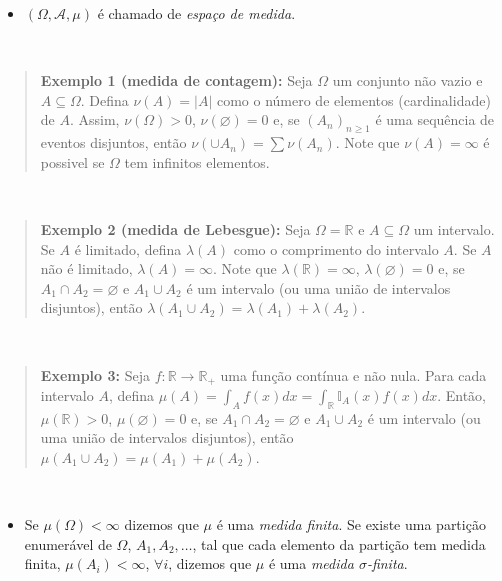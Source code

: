 \documentclass[
]{book}
\providecommand{\tightlist}{%
  \setlength{\itemsep}{0pt}\setlength{\parskip}{0pt}}
\begin{document}
\begin{itemize}
\tightlist
\item
  \((\Omega,\mathcal{A}, \mu)\) é chamado de \emph{espaço de medida}.
\end{itemize}

\(~\)

\begin{quote}
\textbf{Exemplo 1 (medida de contagem):} Seja \(\Omega\) um conjunto não vazio e \(A\subseteq \Omega\). Defina \(\nu(A)=|A|\) como o número de elementos (cardinalidade) de \(A\). Assim, \(\nu(\Omega) > 0\), \(\nu(\varnothing)=0\) e, se \((A_n)_{n \geq 1}\) é uma sequência de eventos disjuntos, então \(\nu(\cup A_n) = \sum \nu(A_n)\). Note que \(\nu(A)=\infty\) é possivel se \(\Omega\) tem infinitos elementos.
\end{quote}

\(~\)

\begin{quote}
\textbf{Exemplo 2 (medida de Lebesgue):} Seja \(\Omega=\mathbb{R}\) e \(A\subseteq \Omega\) um intervalo. Se \(A\) é limitado, defina \(\lambda(A)\) como o comprimento do intervalo \(A\). Se \(A\) não é limitado, \(\lambda(A)=\infty\). Note que \(\lambda(\mathbb{R})=\infty\), \(\lambda(\varnothing)=0\) e, se \(A_1 \cap A_2 = \varnothing\) e \(A_1 \cup A_2\) é um intervalo (ou uma união de intervalos disjuntos), então \(\lambda(A_1 \cup A_2) = \lambda(A_1) + \lambda(A_2)\).
\end{quote}

\(~\)

\begin{quote}
\textbf{Exemplo 3:} Seja \(f: \mathbb{R} \longrightarrow \mathbb{R}_+\) uma função contínua e não nula. Para cada intervalo \(A\), defina \(\displaystyle \mu(A) = \int_A f(x) dx = \int_{\mathbb{R}} \mathbb{I}_A(x) f(x) dx\). Então, \(\mu(\mathbb{R})>0\), \(\mu(\varnothing)=0\) e, se \(A_1 \cap A_2 = \varnothing\) e \(A_1 \cup A_2\) é um intervalo (ou uma união de intervalos disjuntos), então \(\mu(A_1 \cup A_2) = \mu(A_1) + \mu(A_2)\).
\end{quote}

\(~\)

\begin{itemize}
\tightlist
\item
  Se \(\mu(\Omega) < \infty\) dizemos que \(\mu\) é uma \emph{medida finita}. Se existe uma partição enumerável de \(\Omega\), \(A_1,A_2,\ldots\), tal que cada elemento da partição tem medida finita, \(\mu(A_i)<\infty\), \(\forall i\), dizemos que \(\mu\) é uma \emph{medida \(\sigma\)-finita}.
\end{itemize}
\end{document}
